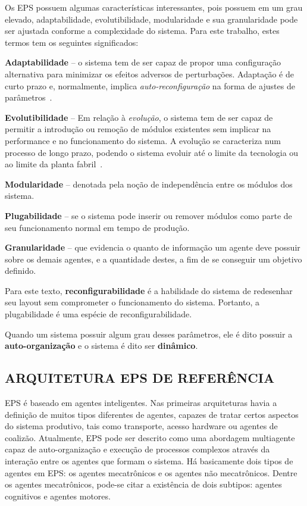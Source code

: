 \documentclass[10pt,letterpaper,twocolumn]{IEEEtran}
\begin{document}
Os EPS possuem algumas características interessantes, pois possuem em um grau elevado, adaptabilidade, evolutibilidade, modularidade e sua granularidade pode ser ajustada conforme a complexidade do sistema. Para este trabalho, estes termos tem os seguintes significados:

\textbf{Adaptabilidade} -- o sistema tem de ser capaz de propor uma configuração alternativa para minimizar os efeitos adversos de perturbações. Adaptação é de curto prazo e, normalmente, implica \textit{auto-reconfiguração} na forma de ajustes de parâmetros~\cite{ROSA2013c}.

\textbf{Evolutibilidade} -- 
Em relação à \textit{evolução}, o sistema tem de ser capaz de permitir a introdução ou remoção de módulos existentes sem implicar na performance e no funcionamento do sistema. A evolução se caracteriza num processo de longo prazo, podendo o sistema evoluir até o limite da tecnologia ou ao limite da planta fabril~\cite{ROSA2013c}.

\textbf{Modularidade} -- denotada pela noção de independência entre os módulos dos sistema.

\textbf{Plugabilidade} -- se o sistema pode inserir ou remover módulos como parte de seu funcionamento normal em tempo de produção.

\textbf{Granularidade} -- que evidencia o quanto de informação um agente deve possuir sobre os demais agentes, e a quantidade destes, a fim de se conseguir um objetivo definido.

Para este texto, \textbf{reconfigurabilidade} é a habilidade do sistema de redesenhar seu layout sem comprometer o funcionamento do sistema. Portanto, a plugabilidade é uma espécie de reconfigurabilidade. 

Quando um sistema possuir algum grau desses parâmetros, ele é dito possuir a \textbf{auto-organização} e o sistema é dito ser \textbf{dinâmico}.


 \subsection{ARQUITETURA EPS DE REFERÊNCIA}
 
 
 EPS é baseado em agentes inteligentes. Nas primeiras arquiteturas havia a definição de muitos tipos diferentes de agentes, capazes de tratar certos aspectos do sistema produtivo, tais como transporte, acesso hardware ou agentes de coalizão. Atualmente, EPS pode ser descrito como uma abordagem multiagente capaz de auto-organização e execução de processos complexos através da interação entre os agentes que formam o sistema. Há basicamente dois tipos de agentes em EPS: os agentes mecatrônicos e os agentes não mecatrônicos. Dentre os agentes mecatrônicos, pode-se citar a existência de dois subtipos: agentes cognitivos e agentes motores. 
 
\end{document}
